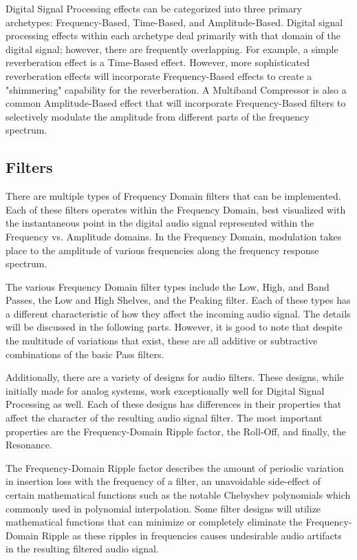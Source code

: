 \documentclass[a4paper,12pt]{report}
\begin{document}
Digital Signal Processing effects can be categorized into three primary archetypes: Frequency-Based, Time-Based, and Amplitude-Based. Digital signal processing effects within each archetype deal primarily with that domain of the digital signal; however, there are frequently overlapping. For example, a simple reverberation effect is a Time-Based effect. However, more sophisticated reverberation effects will incorporate Frequency-Based effects to create a "shimmering" capability for the reverberation. A Multiband Compressor is also a common Amplitude-Based effect that will incorporate Frequency-Based filters to selectively modulate the amplitude from different parts of the frequency spectrum.

\subsection{Filters}
There are multiple types of Frequency Domain filters that can be implemented. Each of these filters operates within the Frequency Domain, best visualized with the instantaneous point in the digital audio signal represented within the Frequency vs. Amplitude domains. In the Frequency Domain, modulation takes place to the amplitude of various frequencies along the frequency response spectrum. 

The various Frequency Domain filter types include the Low, High, and Band Passes, the Low and High Shelves, and the Peaking filter. Each of these types has a different characteristic of how they affect the incoming audio signal. The details will be discussed in the following parts. However, it is good to note that despite the multitude of variations that exist, these are all additive or subtractive combinations of the basic Pass filters.

Additionally, there are a variety of designs for audio filters. These designs, while initially made for analog systems, work exceptionally well for Digital Signal Processing as well. Each of these designs has differences in their properties that affect the character of the resulting audio signal filter. The most important properties are the Frequency-Domain Ripple factor, the Roll-Off, and finally, the Resonance.

The Frequency-Domain Ripple factor describes the amount of periodic variation in insertion loss with the frequency of a filter, an unavoidable side-effect of certain mathematical functions such as the notable Chebyshev polynomials which commonly used in polynomial interpolation. Some filter designs will utilize mathematical functions that can minimize or completely eliminate the Frequency-Domain Ripple as these ripples in frequencies causes undesirable audio artifacts in the resulting filtered audio signal.
\end{document}

